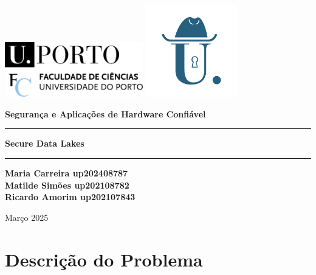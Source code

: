 \documentclass[a4paper,12pt]{article}
\begin{document}
\begin{titlepage}
    \centering
    \includegraphics[width=6cm]{images/logo_fcup.png} 
    \includegraphics[width=4cm]{images/logo_msi.png}
    \vspace{2cm}

\begin{center}
    {\Large \bfseries Segurança e Aplicações de Hardware Confiável}
    \vspace{1cm}
    \hrule 
    \vspace{0.5cm} 
    {\LARGE\bfseries Secure Data Lakes \par}
    \vspace{0.5cm}
    \hrule 
\end{center}

\vfill

    {\large \textbf{Maria Carreira up202408787 \\
    Matilde Simões up202108782 \\
    Ricardo Amorim up202107843} \par}
    \vspace{0.5cm}

    {\Large Março 2025 \par}
\end{titlepage}

\newpage

\setcounter{page}{1}  %
\tableofcontents
\newpage


\section{Descrição do Problema}


\end{document}
